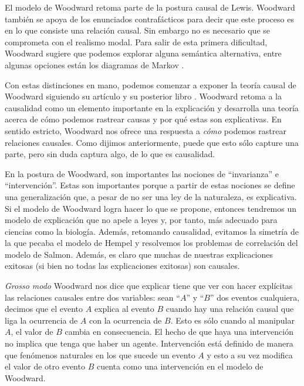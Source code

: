 El modelo de Woodward retoma parte de la postura causal de Lewis. Woodward también se apoya de los enunciados contrafácticos para decir que este proceso es en lo que consiste una relación causal. Sin embargo no es necesario que se comprometa con el realismo modal. Para salir de esta primera dificultad, Woodward sugiere que podemos explorar alguna semántica alternativa, entre algunas opciones están los diagramas de Markov \cite{pittphilsci18628}.

Con estas distinciones en mano, podemos comenzar a exponer la teoría causal de Woodward siguiendo su artículo \citeyear{Woodward2000} y su posterior libro \citeyear{Woodward2003}.  Woodward  retoma a la causalidad como un elemento importante en la explicación y desarrolla una teoría acerca de cómo podemos rastrear causas y por qué estas son explicativas. En sentido estricto, Woodward nos ofrece una respuesta a \textit{cómo} podemos rastrear relaciones causales. Como dijimos anteriormente, puede que esto sólo capture una parte, pero sin duda captura algo, de lo que es causalidad.

En la postura de Woodward, son importantes las nociones de ``invarianza'' e ``intervención''. Estas son importantes porque a partir de estas nociones se define una generalización que, a pesar de no ser una ley de la naturaleza, es explicativa. Si el modelo de Woodward logra hacer lo que se propone, entonces tendremos un modelo de explicación que no apele a leyes y, por tanto, más adecuado para ciencias como la biología. Además, retomando causalidad, evitamos la simetría de la que pecaba el modelo de Hempel y resolvemos los problemas de correlación del modelo de Salmon. Además, es claro que muchas de nuestras explicaciones exitosas (si bien no todas las explicaciones exitosas) son causales.

\textit{Grosso modo} Woodward nos dice que explicar tiene que ver con hacer explícitas las relaciones causales entre dos variables: sean ``$A$'' y ``$B$'' dos eventos cualquiera, decimos que el evento $A$ explica al evento $B$ cuando hay una relación causal que liga la ocurrencia de $A$ con la ocurrencia de $B$. Esto es sólo cuando al manipular $A$, el valor de $B$ cambia en consecuencia. El hecho de que haya una intervención no implica que tenga que haber un agente. Intervención está definido de manera que fenómenos naturales en los que sucede un evento $A$ y esto a su vez modifica el valor de otro evento $B$ cuenta como una intervención en el modelo de Woodward.


